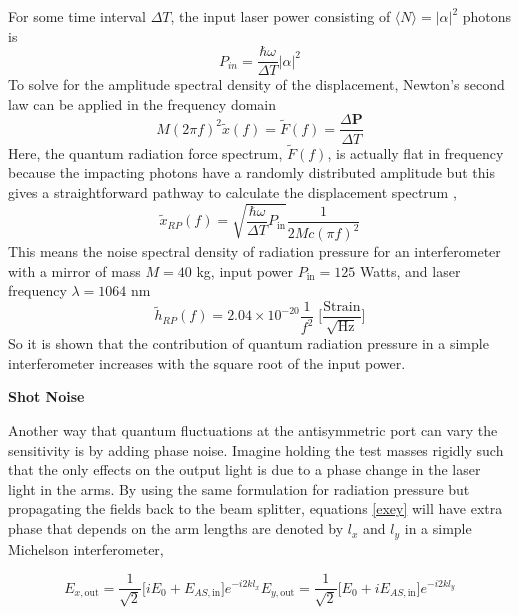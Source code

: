 		For some time interval $\Delta T$, the input laser power consisting of $\langle N \rangle =\vert\alpha \vert^2$ photons is
		\begin{equation}
		P_{in} = \frac{\hbar \omega}{\Delta T} \vert \alpha \vert^2
		\end{equation}
		To solve for the amplitude spectral density of the displacement, Newton's second law can be applied in the frequency domain
		\begin{equation}
		M (2\pi f)^2 \tilde{x}(f) = \tilde{F}(f) = \frac{\Delta \mathbf{P}}{\Delta T}
		\end{equation}
		Here, the quantum radiation force spectrum, $\tilde{F}(f)$, is actually flat in frequency because the impacting photons have a randomly distributed amplitude but this gives a straightforward pathway to calculate the displacement spectrum ,
		\begin{equation}
		\tilde{x}_{RP}(f) = \sqrt{\frac{\hbar \omega}{\Delta T} P_{\text{in}}} \frac{1}{2Mc (\pi f)^2}
		\end{equation}
		This means the noise spectral density of radiation pressure for an interferometer with a mirror of mass $M=40 $ kg, input power $P_{\text{in}}=125$ Watts, and laser frequency $\lambda=1064$ nm
		\begin{equation}
		\tilde{h}_{RP}(f) = 2.04\times 10^{-20} \frac{1}{f^2} \; \bigg[ \frac{\text{Strain}}{\sqrt{\text{Hz}}}\bigg]
		\end{equation}
		So it is shown that the contribution of quantum radiation pressure in a simple interferometer increases with the square root of the input power.
		
		\textbf{Shot Noise}
		
		Another way that quantum fluctuations at the antisymmetric port can vary the sensitivity is by adding phase noise.  Imagine holding the test masses rigidly such that the only effects on the output light is due to a phase change in the laser light in the arms. By using the same formulation for radiation pressure but propagating the fields back to the beam splitter, equations \ref{exey} will have extra phase that depends on the arm lengths are denoted by $l_x$ and $l_y$ in a simple Michelson interferometer,
		
		\begin{subequations}\label{exeyout}
		\begin{equation}
		E_{x,\text{out}} = \frac{1}{\sqrt{2}} \bigg[ iE_0 +   E_{AS,\text{in}} \bigg] e^{-i2k l_x}
		\end{equation}
		\begin{equation}
		E_{y,\text{out}} = \frac{1}{\sqrt{2}} \bigg[  E_0 + i E_{AS,\text{in}} \bigg] e^{-i2k l_y}
		\end{equation}
		\end{subequations}
		
